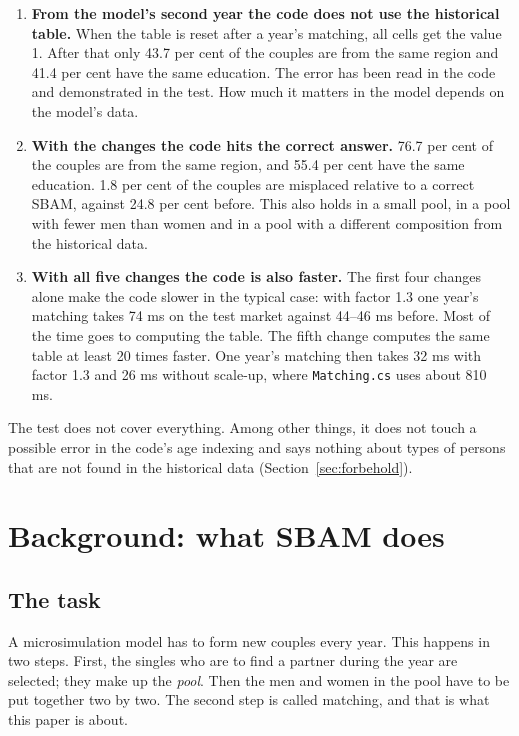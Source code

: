 \documentclass[12pt,a4paper]{article}
\newcommand{\kode}[1]{\texttt{#1}}
\begin{document}
\begin{enumerate}[resume]
\item \textbf{From the model's second year the code does not use the historical table.} When the
table is reset after a year's matching, all cells get the value 1. After that only 43.7 per cent of
the couples are from the same region and 41.4 per cent have the same education. The error has been
read in the code and demonstrated in the test. How much it matters in the model depends on the
model's data.

\item \textbf{With the changes the code hits the correct answer.} 76.7 per cent of the couples are
from the same region, and 55.4 per cent have the same education. 1.8 per cent of the couples are
misplaced relative to a correct SBAM, against 24.8 per cent before. This also holds in a small pool,
in a pool with fewer men than women and in a pool with a different composition from the historical
data.

\item \textbf{With all five changes the code is also faster.} The first four changes alone make the
code slower in the typical case: with factor 1.3 one year's matching takes 74 ms on the test market
against 44--46 ms before. Most of the time goes to computing the table. The fifth change computes
the same table at least 20 times faster. One year's matching then takes 32 ms with factor 1.3 and
26 ms without scale-up, where \kode{Matching.cs} uses about 810 ms.
\end{enumerate}

The test does not cover everything. Among other things, it does not touch a possible error in the
code's age indexing and says nothing about types of persons that are not found in the historical
data (Section~\ref{sec:forbehold}).


\section{Background: what SBAM does}\label{sec:sbam}

\subsection{The task}

A microsimulation model has to form new couples every year. This happens in two steps. First, the
singles who are to find a partner during the year are selected; they make up the \emph{pool}. Then
the men and women in the pool have to be put together two by two. The second step is called
matching, and that is what this paper is about.
\end{document}
